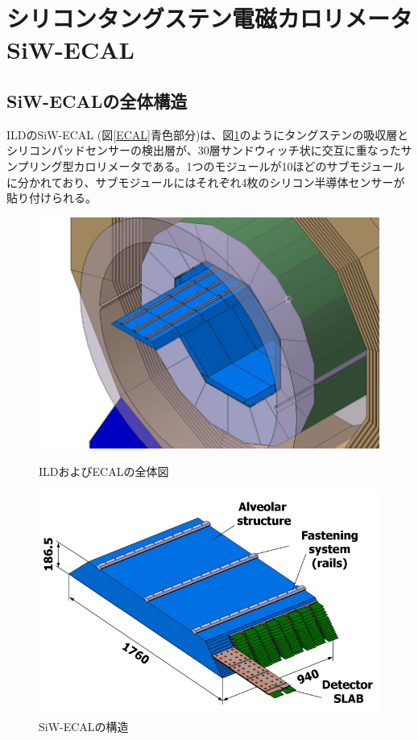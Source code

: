 \section{シリコンタングステン電磁カロリメータ SiW-ECAL}
\subsection{SiW-ECALの全体構造}
ILDのSiW-ECAL (図\ref{ECAL}青色部分)は、図\ref{SiW-ECAL}のようにタングステンの吸収層とシリコンパッドセンサーの検出層が、30層サンドウィッチ状に交互に重なったサンプリング型カロリメータである。1つのモジュールが10ほどのサブモジュールに分かれており、サブモジュールにはそれぞれ4枚のシリコン半導体センサーが貼り付けられる。
\begin{figure}[h]
 \begin{minipage}[h]{.45\linewidth}
	\begin{center}
 \includegraphics[keepaspectratio, scale=0.8]
 	{Figure/Siwecal/ECAL.png}
 		\caption[ILDおよびECALの全体図]{ILDおよびECALの全体図~\cite{tdr2}}
 		\label{ECAL}
	\end{center}
\end{minipage}
\hfill
\begin{minipage}[h]{.45\linewidth}
	\begin{center}
 \includegraphics[keepaspectratio, scale=0.8]
 	{Figure/Siwecal/SiW-ECAL.png}
 		\caption{SiW-ECALの構造~\cite{tdr2}}
 		\label{SiW-ECAL}
	\end{center}
\end{minipage}
\end{figure}

